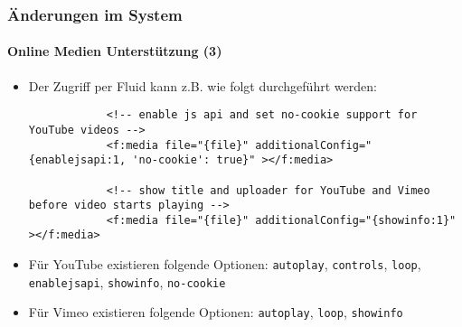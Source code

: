 \begin{frame}[fragile]
	\frametitle{Änderungen im System}
	\framesubtitle{Online Medien Unterstützung (3)}

	\lstset{basicstyle=\tiny\ttfamily}

	\begin{itemize}

		\item Der Zugriff per Fluid kann z.B. wie folgt durchgeführt werden:

		\begin{lstlisting}
			<!-- enable js api and set no-cookie support for YouTube videos -->
			<f:media file="{file}" additionalConfig="{enablejsapi:1, 'no-cookie': true}" ></f:media>

			<!-- show title and uploader for YouTube and Vimeo before video starts playing -->
			<f:media file="{file}" additionalConfig="{showinfo:1}" ></f:media>
		\end{lstlisting}

		\item Für YouTube existieren folgende Optionen:\newline
			\small
				\texttt{autoplay}, \texttt{controls}, \texttt{loop}, \texttt{enablejsapi}, \texttt{showinfo}, \texttt{no-cookie}
			\normalsize
		\item Für Vimeo existieren folgende Optionen:\newline
			\small
				\texttt{autoplay}, \texttt{loop}, \texttt{showinfo}
			\normalsize
	\end{itemize}

\end{frame}


